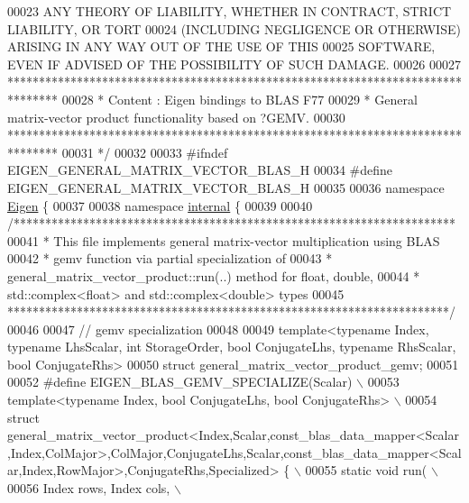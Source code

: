 \begin{DoxyCode}
00023 \textcolor{comment}{ ANY THEORY OF LIABILITY, WHETHER IN CONTRACT, STRICT LIABILITY, OR TORT}
00024 \textcolor{comment}{ (INCLUDING NEGLIGENCE OR OTHERWISE) ARISING IN ANY WAY OUT OF THE USE OF THIS}
00025 \textcolor{comment}{ SOFTWARE, EVEN IF ADVISED OF THE POSSIBILITY OF SUCH DAMAGE.}
00026 \textcolor{comment}{}
00027 \textcolor{comment}{ ********************************************************************************}
00028 \textcolor{comment}{ *   Content : Eigen bindings to BLAS F77}
00029 \textcolor{comment}{ *   General matrix-vector product functionality based on ?GEMV.}
00030 \textcolor{comment}{ ********************************************************************************}
00031 \textcolor{comment}{*/}
00032 
00033 \textcolor{preprocessor}{#ifndef EIGEN\_GENERAL\_MATRIX\_VECTOR\_BLAS\_H}
00034 \textcolor{preprocessor}{#define EIGEN\_GENERAL\_MATRIX\_VECTOR\_BLAS\_H}
00035 
00036 \textcolor{keyword}{namespace }\hyperlink{namespace_eigen}{Eigen} \{ 
00037 
00038 \textcolor{keyword}{namespace }\hyperlink{namespaceinternal}{internal} \{
00039 
00040 \textcolor{comment}{/**********************************************************************}
00041 \textcolor{comment}{* This file implements general matrix-vector multiplication using BLAS}
00042 \textcolor{comment}{* gemv function via partial specialization of}
00043 \textcolor{comment}{* general\_matrix\_vector\_product::run(..) method for float, double,}
00044 \textcolor{comment}{* std::complex<float> and std::complex<double> types}
00045 \textcolor{comment}{**********************************************************************/}
00046 
00047 \textcolor{comment}{// gemv specialization}
00048 
00049 \textcolor{keyword}{template}<\textcolor{keyword}{typename} Index, \textcolor{keyword}{typename} LhsScalar, \textcolor{keywordtype}{int} StorageOrder, \textcolor{keywordtype}{bool} ConjugateLhs, \textcolor{keyword}{typename} RhsScalar, \textcolor{keywordtype}{bool} 
      ConjugateRhs>
00050 \textcolor{keyword}{struct }general\_matrix\_vector\_product\_gemv;
00051 
00052 \textcolor{preprocessor}{#define EIGEN\_BLAS\_GEMV\_SPECIALIZE(Scalar) \(\backslash\)}
00053 \textcolor{preprocessor}{template<typename Index, bool ConjugateLhs, bool ConjugateRhs> \(\backslash\)}
00054 \textcolor{preprocessor}{struct
       general\_matrix\_vector\_product<Index,Scalar,const\_blas\_data\_mapper<Scalar,Index,ColMajor>,ColMajor,ConjugateLhs,Scalar,const\_blas\_data\_mapper<Scalar,Index,RowMajor>,ConjugateRhs,Specialized> \{ \(\backslash\)}
00055 \textcolor{preprocessor}{static void run( \(\backslash\)}
00056 \textcolor{preprocessor}{  Index rows, Index cols, \(\backslash\)}

\end{DoxyCode}
